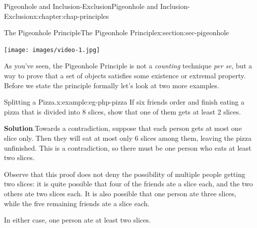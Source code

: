 \documentclass[oneside,10pt,]{book}
\newcommand{\blocktitlefont}{\relax}
\numberwithin{equation}{section}
\newlength{\qrsize}
\newlength{\previewwidth}
\begin{document}
\begin{chapterptx}{Pigeonhole and Inclusion-Exclusion}{}{Pigeonhole and Inclusion-Exclusion}{}{}{x:chapter:chap-principles}
\begin{sectionptx}{The Pigeonhole Principle}{}{The Pigeonhole Principle}{}{}{x:section:sec-pigeonhole}
\begin{sidebyside}{1}{0.1}{0.1}{0}
\begin{sbspanel}{0.8}
\begin{tcbraster}[raster columns=2, raster column skip=1pt, raster halign=center, raster force size=false, raster left skip=0pt, raster right skip=0pt]
\begin{tcolorbox}[previewstyle, width=\previewwidth]%
\texttt{[image: images/video-1.jpg]}%
\end{tcolorbox}%
\begin{tcolorbox}[qrstyle]%
{\hypersetup{urlcolor=black}}%
\end{tcolorbox}%
\end{tcbraster}%
\end{sbspanel}%
\end{sidebyside}%
\par
As you've seen, the Pigeonhole Principle is not a \emph{counting} technique \emph{per se}, but a way to prove that a set of objects satisfies some existence or extremal property. Before we state the principle formally let's look at two more examples.%
\begin{example}{Splitting a Pizza.}{x:example:eg-php-pizza}%
If six friends order and finish eating a pizza that is divided into 8 slices, show that one of them gets at least 2 slices.%
\par\smallskip%
\noindent\textbf{\blocktitlefont Solution}.\hypertarget{g:solution:id262101}{}\quad{}Towards a contradiction, suppose that each person gets at most one slice only. Then they will eat at most only 6 slices among them, leaving the pizza unfinished. This is a contradiction, so there must be one person who eats at least two slices.%
\par
Observe that this proof does not deny the possibility of multiple people getting two slices: it is quite possible that four of the friends ate a slice each, and the two others ate two slices each. It is also possible that one person ate three slices, while the five remaining friends ate a slice each.%
\par
In either case, one person ate at least two slices.%
\end{example}
%
\begin{sidebyside}{1}{0.325}{0.325}{0}%
\begin{sbspanel}{0.35}%
\end{sbspanel}
\end{sidebyside}
\end{sectionptx}
\end{chapterptx}
\end{document}
